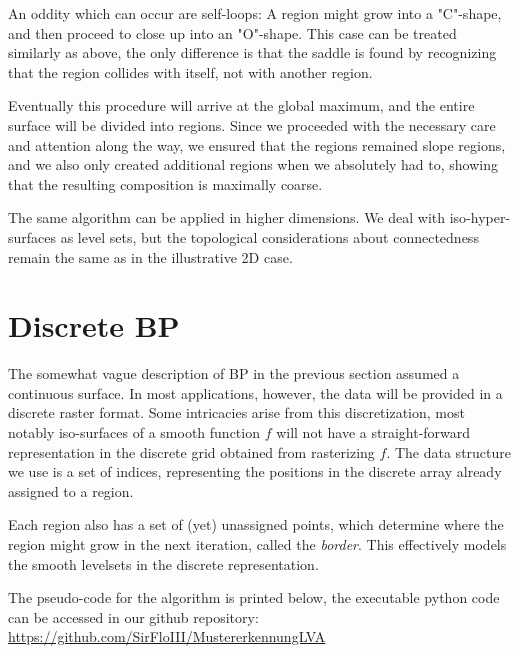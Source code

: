 \documentclass[11pt,twoside,twocolumn,a4paper]{article}
\theoremstyle{plain}
\theoremstyle{definition}
\begin{document}
An oddity which can occur are self-loops: A region might grow into a "C"-shape, and then proceed to close up into an "O"-shape.
This case can be treated similarly as above, the only difference is that the saddle is found by recognizing that the region collides with itself, not with another region.

Eventually this procedure will arrive at the global maximum, and the entire surface will be divided into regions.
Since we proceeded with the necessary care and attention along the way, we ensured that the regions remained slope regions, and we also only created additional regions when we absolutely had to, showing that the resulting composition is maximally coarse.

The same algorithm can be applied in higher dimensions.
We deal with iso-hyper-surfaces as level sets, but the topological considerations about connectedness remain the same as in the illustrative 2D case.

\section{Discrete BP}
\label{sec:details}

The somewhat vague description of BP in the previous section assumed a continuous surface.
In most applications, however, the data will be provided in a discrete raster format.
Some intricacies arise from this discretization, most notably iso-surfaces of a smooth function $f$ will not have a straight-forward representation in the discrete grid obtained from rasterizing $f$.
The data structure we use is a set of indices, representing the positions in the discrete array already assigned to a region.

Each region also has a set of (yet) unassigned points, which determine where the region might grow in the next iteration, called the \emph{border}.
This effectively models the smooth levelsets in the discrete representation.

The pseudo-code for the algorithm is printed below, the executable python code can be accessed in our github repository:
\url{https://github.com/SirFloIII/MustererkennungLVA}
\end{document}
